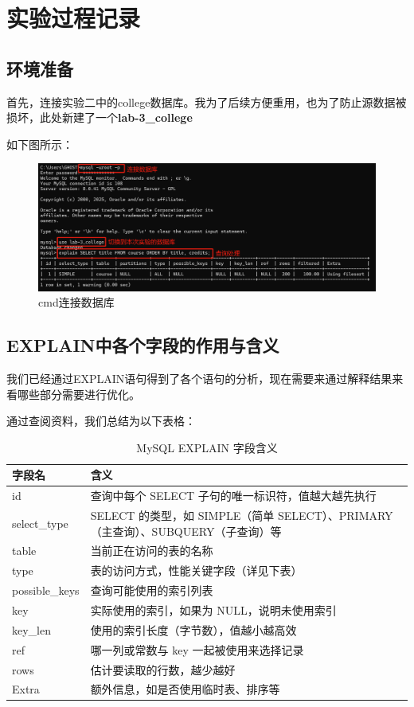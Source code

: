 \documentclass{article}
\begin{document}
	\section{实验过程记录}
	
	\subsection{环境准备}
	
	首先，连接实验二中的college数据库。我为了后续方便重用，也为了防止源数据被损坏，此处新建了一个\textbf{lab-3\_college}
	
	如下图所示：
	
	\begin{figure}[H]
		\centering
		\includegraphics[width=13cm]{./images/1.cmd连接数据库.png}
		\caption{cmd连接数据库}
	\end{figure}
	
	\subsection{EXPLAIN中各个字段的作用与含义}
	
	我们已经通过EXPLAIN语句得到了各个语句的分析，现在需要来通过解释结果来看哪些部分需要进行优化。
	
	通过查阅资料，我们总结为以下表格：
	
	\begin{table}[H]
		\centering
		\begin{tabular}{|l|p{10cm}|}
			\hline
			\textbf{字段名} & \textbf{含义} \\
			\hline
			id & 查询中每个 SELECT 子句的唯一标识符，值越大越先执行 \\
			\hline
			select\_type & SELECT 的类型，如 SIMPLE（简单 SELECT）、PRIMARY（主查询）、SUBQUERY（子查询）等 \\
			\hline
			table & 当前正在访问的表的名称 \\
			\hline
			type & 表的访问方式，性能关键字段（详见下表） \\
			\hline
			possible\_keys & 查询可能使用的索引列表 \\
			\hline
			key & 实际使用的索引，如果为 NULL，说明未使用索引 \\
			\hline
			key\_len & 使用的索引长度（字节数），值越小越高效 \\
			\hline
			ref & 哪一列或常数与 key 一起被使用来选择记录 \\
			\hline
			rows & 估计要读取的行数，越少越好 \\
			\hline
			Extra & 额外信息，如是否使用临时表、排序等 \\
			\hline
		\end{tabular}
		\caption{MySQL EXPLAIN 字段含义}
	\end{table}
	
\end{document}
